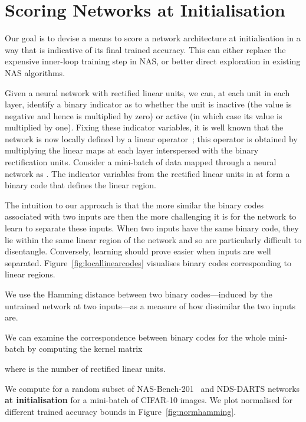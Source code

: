 \documentclass{article}
\begin{document}
\section{Scoring Networks at Initialisation}
\label{sec:scoring}

Our goal is to devise a means to score a network architecture at initialisation in a way that is indicative of its final trained accuracy. This can either replace the expensive inner-loop training step in NAS, or better direct exploration in existing NAS algorithms.

Given a neural network with rectified linear units, we can, at each unit in each layer, identify a binary indicator as to whether the unit is inactive (the value is negative and hence is multiplied by zero) or active (in which case its value is multiplied by one). Fixing these indicator variables, it is well known that the network is now locally defined by a linear operator~\citep{hanin2019deep}; this operator is obtained by multiplying the linear maps at each layer interspersed with the binary rectification units. Consider a mini-batch of data  mapped through a neural network as . The indicator variables from the rectified linear units in  at  form a binary code  that defines the linear region.

The intuition to our approach is that the more similar the binary codes associated with two inputs are then the more challenging it is for the network to learn to separate these inputs. When two inputs have the same binary code, they lie within the same linear region of the network and so are particularly difficult to disentangle. Conversely, learning should prove easier when inputs are well separated. Figure~\ref{fig:locallinearcodes} visualises binary codes corresponding to linear regions. 

We use the Hamming distance  between two binary codes---induced by the untrained network at two inputs---as a measure of how dissimilar the two inputs are. 


We can examine the correspondence between binary codes for the whole mini-batch by computing the kernel matrix


where  is the number of rectified linear units. 

We compute  for a random subset of NAS-Bench-201~\citep{Dong2020NAS-Bench-201} and NDS-DARTS \citep{radosavovic2019network} networks {\bf at initialisation} for a mini-batch of CIFAR-10 images. We plot normalised  for different trained accuracy bounds in Figure~\ref{fig:normhamming}.
\end{document}
